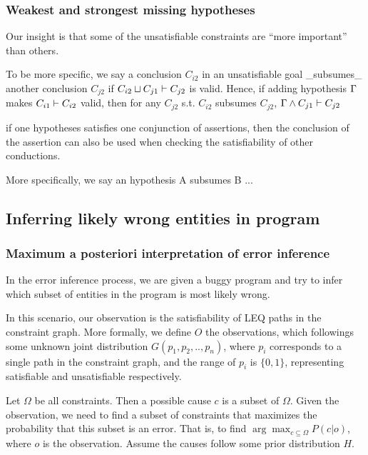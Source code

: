 \subsubsection{Weakest and strongest missing hypotheses}

Our insight is that some of the unsatisfiable constraints are ``more
important'' than others.

To be more specific, we say a conclusion $C_{i2}$ in an unsatisfiable goal
_subsumes_ another conclusion $C_{j2}$ if $C_{i2}\sqcup C_{j1} \vdash C_{j2}$
is valid. Hence, if adding hypothesis $\Gamma$ makes $C_{i1}\vdash C_{i2}$ valid,
then for any $C_{j2}$ s.t. $C_{i2}$ subsumes $C_{j2}$, $\Gamma\land C_{j1}\vdash
C_{j2}$


if one hypotheses satisfies one conjunction of assertions,
then the conclusion of the assertion can also be used when checking the
satisfiability of other conductions.

More specifically, we say an hypothesis A subsumes B ...

\subsection{Inferring likely wrong entities in program}
\label{sec:mapmodel}

\subsubsection{Maximum a posteriori interpretation of error inference}

In the error inference process, we are given a buggy program and try to infer
which subset of entities in the program is most likely wrong.  

In this scenario, our observation is the satisfiability of LEQ paths in the
constraint graph. More formally, we define $O$ the observations, which
followings some unknown joint distribution $G(p_1, p_2, .., p_n)$, where
$p_i$ corresponds to a single path in the constraint graph, and the range of
$p_i$ is $\{0, 1\}$, representing satisfiable and unsatisfiable respectively.

Let $\Omega$ be all constraints. Then a possible cause $c$ is a subset of
$\Omega$. Given the observation, we need to find a subset of constraints that
maximizes the probability that this subset is an error. That is, to find
$\arg\max_{c \subseteq \Omega} P(c|o)$, where $o$ is the observation.  Assume the
causes follow some prior distribution $H$.

